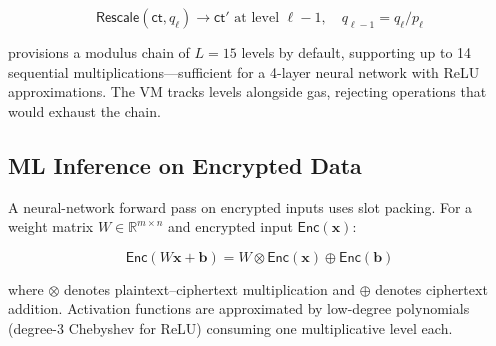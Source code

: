 \begin{equation}
  \mathsf{Rescale}(\mathsf{ct}, q_\ell) \to \mathsf{ct}' \text{ at level } \ell - 1, \quad q_{\ell-1} = q_\ell / p_\ell
\end{equation}

\Zoo{} provisions a modulus chain of $L = 15$ levels by default, supporting up to 14 sequential multiplications---sufficient for a 4-layer neural network with ReLU approximations. The VM tracks levels alongside gas, rejecting operations that would exhaust the chain.

\subsection{ML Inference on Encrypted Data}

A neural-network forward pass on encrypted inputs uses \CKKS{} slot packing. For a weight matrix $W \in \mathbb{R}^{m \times n}$ and encrypted input $\mathsf{Enc}(\mathbf{x})$:

\begin{equation}
  \mathsf{Enc}(W\mathbf{x} + \mathbf{b}) = W \otimes \mathsf{Enc}(\mathbf{x}) \oplus \mathsf{Enc}(\mathbf{b})
\end{equation}

\noindent where $\otimes$ denotes plaintext--ciphertext multiplication and $\oplus$ denotes ciphertext addition. Activation functions are approximated by low-degree polynomials (degree-3 Chebyshev for ReLU) consuming one multiplicative level each.

